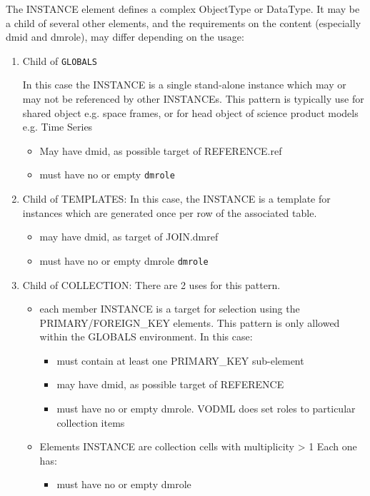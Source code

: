 The INSTANCE element defines a complex ObjectType or DataType.
It may be a child of several other elements, and the requirements on
the content (especially dmid and dmrole), may differ depending on
the usage:


\begin{enumerate}
\item Child of \texttt{GLOBALS}

   In this case the INSTANCE is a single stand-alone instance which
   may or may not be referenced by other INSTANCEs. This pattern is typically use for 
   shared object e.g. space frames, or for head object of science product models e.g. Time Series
  \begin{itemize}
     \item May have dmid, as possible target of REFERENCE.ref
     \item must have no or empty \texttt{dmrole}
  \end{itemize}  
     
\item Child of TEMPLATES:
  In this case, the INSTANCE is a template for instances which
  are generated once per row of the associated table.  
  \begin{itemize}
     \item may have dmid, as target of JOIN.dmref
     \item must have no or empty dmrole \texttt{dmrole}
  \end{itemize}  

\item Child of COLLECTION:
  There are 2 uses for this pattern.  
  \begin{itemize}
     \item each member INSTANCE is a target for selection using
           the PRIMARY/FOREIGN\_KEY elements. This pattern is only 
           allowed within the GLOBALS environment. In this case:             
           \begin{itemize}
             \item must contain at least one PRIMARY\_KEY sub-element
             \item may have dmid, as possible target of REFERENCE
             \item must have no or empty dmrole. VODML does set roles to particular collection items
           \end{itemize}

     \item Elements INSTANCE are collection cells with multiplicity > 1
          Each one has:             
           \begin{itemize}
             \item must have no or empty dmrole
           \end{itemize}
  \end{itemize}  
    

\end{enumerate}
